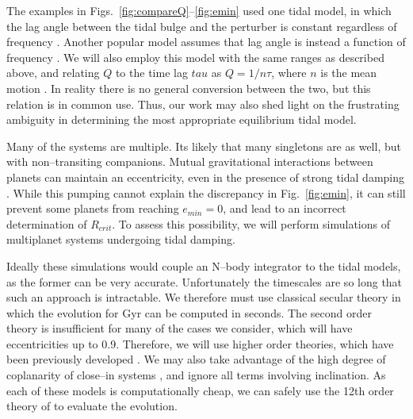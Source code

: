 The examples in Figs.~\ref{fig:compareQ}--\ref{fig:emin} used one
tidal model, in which the lag angle between the tidal bulge and the
perturber is constant regardless of frequency
\citep[e.g.][]{GoldreichSoter66,Jackson08}.  Another popular model
assumes that lag angle is instead a function of frequency
\citep[e.g.][]{Hut81,Matsumura10}.  We will also employ this model
with the same ranges as described above, and relating $Q$ to the time
lag $tau$ as $Q = 1/n\tau$, where $n$ is the mean motion
\citep[e.g.][]{Correia12}.  In reality there is no general conversion between
the two, but this relation is in common use.  Thus, our work may also
shed light on the frustrating ambiguity in determining the most
appropriate equilibrium tidal model.

\medskip
{\centerline{}}
\smallskip

Many of the \kepler systems are multiple.  Its likely that many
singletons are as well, but with non--transiting companions.  Mutual
gravitational interactions between planets can maintain an
eccentricity, even in the presence of strong tidal damping
\citep{MardlingLin02,GreenbergVanLaerhoven11,Correia12}.  While this
pumping cannot explain the discrepancy in Fig.~\ref{fig:emin}, it can
still prevent some planets from reaching $e_{min} = 0$, and lead to an
incorrect determination of $R_{crit}$.  To assess this possibility, we
will perform simulations of multiplanet systems undergoing tidal
damping.

Ideally these simulations would couple an N--body integrator to the
tidal models, as the former can be very accurate.  Unfortunately the
timescales are so long that such an approach is intractable.  We
therefore must use classical secular theory in which the evolution for
Gyr can be computed in seconds.  The second order theory is
insufficient for many of the cases we consider, which will have
eccentricities up to 0.9.  Therefore, we will use higher order
theories, which have been previously developed
\citep[e.g.][]{Ford00,VerasArmitage04,LibertHenrard05}.  We may also
take advantage of the high degree of coplanarity of close--in
\kepler systems \cite{Fabrycky12}, and ignore all terms involving
inclination.  As each of these models is computationally cheap, we can
safely use the 12th order theory of \cite{LibertHenrard05} to evaluate
the evolution.  

